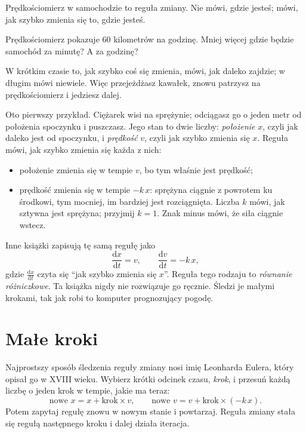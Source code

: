 \noindent
Prędkościomierz w samochodzie to reguła zmiany. Nie mówi, gdzie jesteś;
mówi, jak szybko zmienia się to, gdzie jesteś.

\begin{think}
Prędkościomierz pokazuje $60$ kilometrów na godzinę. Mniej więcej gdzie
będzie samochód za minutę? A za godzinę?
\end{think}
W krótkim czasie to, jak szybko coś się zmienia, mówi, jak daleko zajdzie; w
długim mówi niewiele. Więc przejeżdżasz kawałek, znowu patrzysz na
prędkościomierz i jedziesz dalej.

Oto pierwszy przykład. Ciężarek wisi na sprężynie; odciągasz go o jeden metr
od położenia spoczynku i puszczasz. Jego stan to dwie liczby:
\emph{położenie} $x$, czyli jak daleko jest od spoczynku, i \emph{prędkość}
$v$, czyli jak szybko zmienia się $x$. Reguła mówi, jak szybko zmienia się
każda z nich:
\begin{itemize}
\item położenie zmienia się w tempie $v$, bo tym właśnie jest prędkość;
\item prędkość zmienia się w tempie $-k\,x$: sprężyna ciągnie z powrotem ku
  środkowi, tym mocniej, im bardziej jest rozciągnięta. Liczba $k$ mówi, jak
  sztywna jest sprężyna; przyjmij $k = 1$. Znak minus mówi, że siła ciągnie
  wstecz.
\end{itemize}
Inne książki zapisują tę samą regułę jako
\[ \frac{\mathrm{d}x}{\mathrm{d}t} = v, \qquad
   \frac{\mathrm{d}v}{\mathrm{d}t} = -k\,x, \]
gdzie $\tfrac{\mathrm{d}x}{\mathrm{d}t}$ czyta się \enquote{jak szybko
zmienia się $x$}. Reguła tego rodzaju to \emph{równanie różniczkowe}. Ta
książka nigdy nie rozwiązuje go ręcznie. Śledzi je małymi krokami, tak jak
robi to komputer prognozujący pogodę.

\section{Małe kroki}
\label{sec:ch04-euler}

\noindent
Najprostszy sposób śledzenia reguły zmiany nosi imię Leonharda Eulera, który
opisał go w XVIII wieku. Wybierz krótki odcinek czasu, \emph{krok}, i przesuń
każdą liczbę o jeden krok w tempie, jakie ma teraz:
\[ \text{nowe } x = x + \text{krok} \times v, \qquad
   \text{nowe } v = v + \text{krok} \times (-k\,x). \]
Potem zapytaj regułę znowu w nowym stanie i powtarzaj. Reguła zmiany stała
się regułą następnego kroku i dalej działa iteracja.

